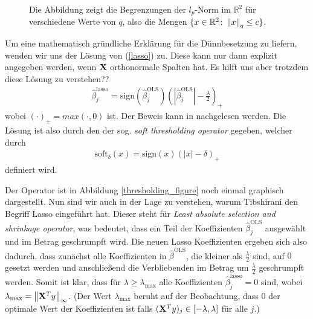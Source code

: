 \begin{figure}
\caption{Die Abbildung zeigt die Begrenzungen der $l_p$-Norm im $\mathbb{R}^2$ für verschiedene Werte von $q$, also die Mengen $\{x \in \mathbb{R}^2 \colon \left\lVert x \right\rVert_{q} \leq c \}$.}
\label{norm_figure}
\end{figure}

Um eine mathematisch gründliche Erklärung für die Dünnbesetzung zu liefern, wenden wir uns der Lösung von (\ref{lasso}) zu. Diese kann nur dann explizit angegeben werden, wenn $\mathbf{X}$ orthonormale Spalten hat. Es hilft uns aber trotzdem diese Lösung zu verstehen??
\begin{align}
\hat{\beta}_j^{\text{lasso}} = \text{sign}(\hat{\beta}_j^{\text{OLS}}) \left(\left|\hat{\beta}_j^{\text{OLS}}\right| - \frac{\lambda}{2}\right)_{+}
\end{align}
wobei $(\cdot)_+ = max(\cdot, 0)$ ist. Der Beweis kann in \cite{murphy} nachgelesen werden. Die Lösung ist also durch den der sog. \textit{soft thresholding operator} gegeben, welcher durch
\begin{align}
\text{soft}_{\delta}(x) = \text{sign}(x)(|x| - \delta)_+
\end{align}
definiert wird.

Der Operator ist in Abbildung \ref{thresholding_figure} noch einmal graphisch dargestellt. Nun sind wir auch in der Lage zu verstehen, warum Tibshirani \cite{tibshirani_lasso} den Begriff Lasso eingeführt hat. Dieser steht für \textit{Least absolute selection and shrinkage operator}, was bedeutet, dass ein Teil der Koeffizienten $\hat{\beta}_j^{\text{OLS}}$ ausgewählt und im Betrag geschrumpft wird. Die neuen Lasso Koeffizienten ergeben sich also dadurch, dass zunächst alle Koeffizienten in $\hat{\beta}^{\text{OLS}}$, die kleiner als $\frac{\lambda}{2}$ sind, auf $0$ gesetzt werden und anschließend die Verbliebenden im Betrag um $\frac{\lambda}{2}$ geschrumpft werden. Somit ist klar, dass für $\lambda \geq \lambda_{\text{max}}$ alle Koeffizienten $\hat{\beta}_j^{\text{lasso}} = 0$ sind, wobei $\lambda_{\text{max}} = \left\lVert \mathbf{X}^Ty \right\rVert_{\infty}$. (Der Wert $\lambda_{\text{max}}$ beruht auf der Beobachtung, dass $0$ der optimale Wert der Koeffizienten ist falls $(\mathbf{X}^Ty)_j \in [-\lambda, \lambda]$ für alle $j$.) 

